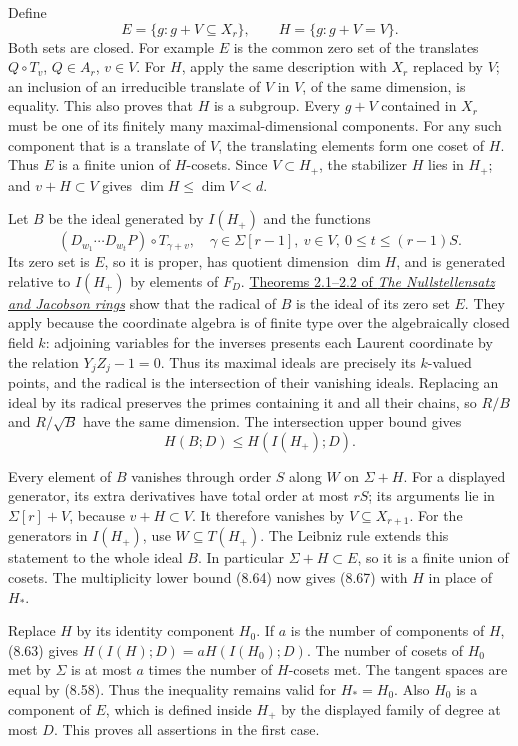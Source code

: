\documentclass[
  11pt,
  a4paper,
]{article}
\begin{document}
Define \[
E=\{g:g+V\subseteq X_r\},\qquad
H=\{g:g+V=V\}.
\] Both sets are closed. For example \(E\) is the common zero set of the
translates \(Q\circ T_v\), \(Q\in A_r\), \(v\in V\). For \(H\), apply
the same description with \(X_r\) replaced by \(V\); an inclusion of an
irreducible translate of \(V\) in \(V\), of the same dimension, is
equality. This also proves that \(H\) is a subgroup. Every \(g+V\)
contained in \(X_r\) must be one of its finitely many
maximal-dimensional components. For any such component that is a
translate of \(V\), the translating elements form one coset of \(H\).
Thus \(E\) is a finite union of \(H\)-cosets. Since \(V\subset H_+\),
the stabilizer \(H\) lies in \(H_+\); and \(v+H\subset V\) gives
\(\dim H\le\dim V<d\).

Let \(B\) be the ideal generated by \(I(H_+)\) and the functions \[
(D_{w_1}\cdots D_{w_t}P)\circ T_{\gamma+v},
\quad
\gamma\in\Sigma[r-1],\ v\in V,\ 0\le t\le(r-1)S.
\] Its zero set is \(E\), so it is proper, has quotient dimension
\(\dim H\), and is generated relative to \(I(H_+)\) by elements of
\(F_D\).
\href{https://kokunoyumeto.github.io/open-math-courses-public/courses/AG-CA/the-nullstellensatz-and-jacobson-rings.html\#2-closed-points-detect-radical-equations}{Theorems
2.1--2.2 of \emph{The Nullstellensatz and Jacobson rings}} show that the
radical of \(B\) is the ideal of its zero set \(E\). They apply because
the coordinate algebra is of finite type over the algebraically closed
field \(k\): adjoining variables for the inverses presents each Laurent
coordinate by the relation \(Y_jZ_j-1=0\). Thus its maximal ideals are
precisely its \(k\)-valued points, and the radical is the intersection
of their vanishing ideals. Replacing an ideal by its radical preserves
the primes containing it and all their chains, so \(R/B\) and
\(R/\sqrt B\) have the same dimension. The intersection upper bound
gives \[
H(B;D)\le H(I(H_+);D).
\]

Every element of \(B\) vanishes through order \(S\) along \(W\) on
\(\Sigma+H\). For a displayed generator, its extra derivatives have
total order at most \(rS\); its arguments lie in \(\Sigma[r]+V\),
because \(v+H\subset V\). It therefore vanishes by
\(V\subseteq X_{r+1}\). For the generators in \(I(H_+)\), use
\(W\subseteq T(H_+)\). The Leibniz rule extends this statement to the
whole ideal \(B\). In particular \(\Sigma+H\subset E\), so it is a
finite union of cosets. The multiplicity lower bound (8.64) now gives
(8.67) with \(H\) in place of \(H_*\).

Replace \(H\) by its identity component \(H_0\). If \(a\) is the number
of components of \(H\), (8.63) gives \(H(I(H);D)=aH(I(H_0);D)\). The
number of cosets of \(H_0\) met by \(\Sigma\) is at most \(a\) times the
number of \(H\)-cosets met. The tangent spaces are equal by (8.58). Thus
the inequality remains valid for \(H_*=H_0\). Also \(H_0\) is a
component of \(E\), which is defined inside \(H_+\) by the displayed
family of degree at most \(D\). This proves all assertions in the first
case.
\end{document}
